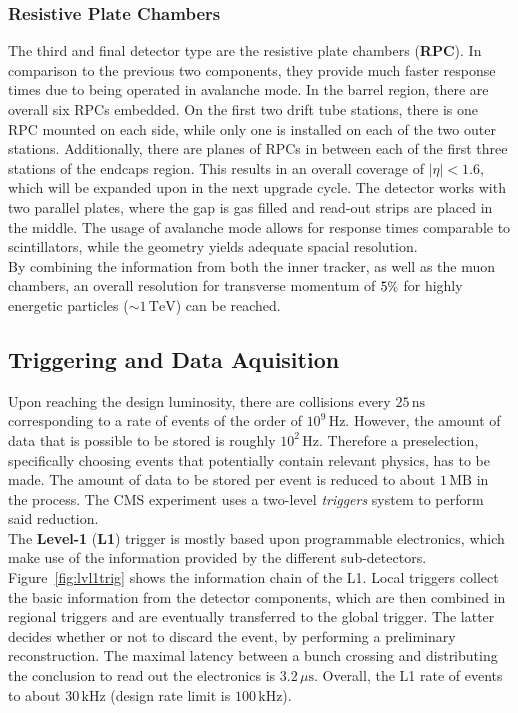 \subsubsection{Resistive Plate Chambers}

The third and final detector type are the resistive plate chambers (\textbf{RPC}). In comparison to the previous two components, they provide much faster response times due to being operated in avalanche mode. In the barrel region, there are overall six RPCs embedded. On the first two drift tube stations, there is one RPC mounted on each side, while only one is installed on each of the two outer stations. Additionally, there are planes of RPCs in between each of the first three stations of the endcaps region. This results in an overall coverage of $|\eta| < 1.6$, which will be expanded upon in the next upgrade cycle. The detector works with two parallel plates, where the gap is gas filled and read-out strips are placed in the middle. The usage of avalanche mode allows for response times comparable to scintillators, while the geometry yields adequate spacial resolution. \\

By combining the information from both the inner tracker, as well as the muon chambers, an overall resolution for transverse momentum of $5\pct$ for highly energetic particles ($\sim 1\,\text{TeV}$) can be reached.



\subsection{Triggering and Data Aquisition}

Upon reaching the design luminosity, there are collisions every $25\,\text{ns}$ corresponding to a rate of events of the order of $10^9\,\text{Hz}$. However, the amount of data that is possible to be stored is roughly $10^2\,\text{Hz}$. Therefore a preselection, specifically choosing events that potentially contain relevant physics, has to be made. The amount of data to be stored per event is reduced to about $1\,\text{MB}$ in the process. The CMS experiment uses a two-level \textit{triggers} system to perform said reduction. \\

The \textbf{Level-1} (\textbf{L1}) trigger is mostly based upon programmable electronics, which make use of the information provided by the different sub-detectors. Figure~\ref{fig:lvl1trig} shows the information chain of the L1. Local triggers collect the basic information from the detector components, which are then combined in regional triggers and are eventually transferred to the global trigger. The latter decides whether or not to discard the event, by performing a preliminary reconstruction. The maximal latency between a bunch crossing and distributing the conclusion to read out the electronics is $3.2\,\mu\text{s}$. Overall, the L1 rate of events to about $30\,\text{kHz}$ (design rate limit is $100\,\text{kHz}$).

